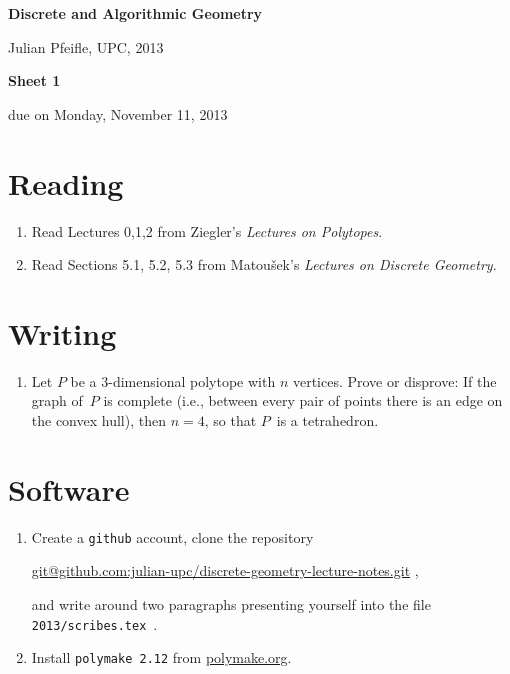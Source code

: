 \documentclass[11pt]{amsart}
\begin{document}
\begin{center}
\textbf{\sffamily
   Discrete and Algorithmic Geometry }

\medskip
   Julian Pfeifle,
   UPC, 2013 \mbox{}
\end{center}

\bigskip

\begin{center}
  \textbf{\sffamily Sheet 1}

\bigskip
 due on Monday, November 11, 2013

\end{center}

\bigskip
\bigskip
\bigskip

\section*{Reading}

\begin{enumerate}
\setlength{\itemsep}{2ex}
\item Read Lectures 0,1,2 from Ziegler's \emph{Lectures on Polytopes}.

\item Read Sections 5.1, 5.2, 5.3 from Matou\v sek's \emph{Lectures on
    Discrete Geometry}.

\end{enumerate}

\bigskip
\bigskip
\section*{Writing}

\begin{enumerate}
\item Let $P$ be a $3$-dimensional polytope with $n$
  vertices. 
  Prove or disprove: 
  If the graph of~$P$ is complete (i.e., between every pair of points
  there is an edge on the convex hull), then $n=4$, so that $P$~is a tetrahedron.
\end{enumerate}

\bigskip
\bigskip
\section*{Software}

\begin{enumerate}
\setlength{\itemsep}{2ex}
\item Create a \texttt{github} account, clone the repository
  \begin{center}
    \url{git@github.com:julian-upc/discrete-geometry-lecture-notes.git} ,
  \end{center}
  and write around two paragraphs presenting yourself into the file
  \texttt{2013/scribes.tex}~.

\item Install \texttt{polymake 2.12} from \url{polymake.org}.
\end{enumerate}
\end{document}
